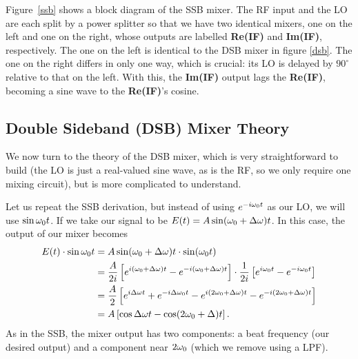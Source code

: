 \documentclass[11pt,preprint]{aastex}
\begin{document}
Figure\ \ref{ssb} shows a block diagram of the SSB mixer.  The RF input
and the LO are each split by a power splitter so that we have two
identical mixers, one on the left and one on the right, whose outputs
are labelled {\bf Re(IF)} and {\bf Im(IF)}, respectively. The one on
the left is identical to the DSB mixer in figure \ref{dsb}. The one on
the right differs in only one way, which is crucial: its LO is delayed
by $90^\circ$ relative to that on the left. With this, the {\bf Im(IF)}
output lags the {\bf Re(IF)}, becoming a sine wave to the {\bf Re(IF)}'s 
cosine.



\subsection {Double Sideband (DSB) Mixer Theory}
%
\noindent
We now turn to the theory of the DSB mixer, which
is very straightforward to build (the LO is just a real-valued sine wave, as is the RF, so we only
require one mixing circuit),
but is more complicated to understand.

Let us repeat the SSB derivation, but instead of
using $e^{-i\omega_0 t}$ as our LO, we will use $\sin \omega_0 t$.
If we take our signal to be $E(t)=A\sin(\omega_0+\Delta\omega)t$.  In this case,
the output of our mixer becomes
\begin{align}
E(t)\cdot \sin\omega_0 t &= A\sin (\omega_0 +\Delta\omega)t\cdot \sin (\omega_0 t)\\
&= \frac{A}{2i}\left[e^{i(\omega_0 +\Delta\omega)t}-e^{-i(\omega_0 +\Delta\omega)t}\right]\cdot
  \frac{1}{2i}\left[e^{i\omega_0 t}-e^{-i\omega_0 t}\right] \\
&= \frac{A}{2}\left[e^{i\Delta\omega t}+e^{-i\Delta\omega_0 t} -
  e^{i(2\omega_0 +\Delta\omega) t}-e^{-i(2\omega_0 +\Delta\omega)t}\right]\\
&= A\left[\cos\Delta\omega t - \cos(2\omega_0 +\Delta)t\right].
\end{align}
As in the SSB, the mixer output has two components: a beat frequency (our
desired output) and a component near $2\omega_0 $ (which we remove using a LPF).
\end{document}
